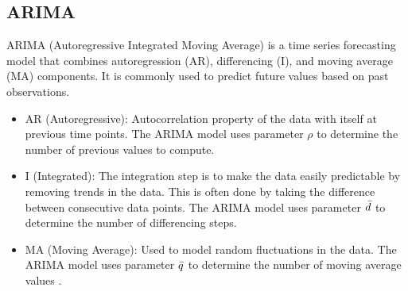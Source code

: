 \documentclass{ieeeojies}
\begin{document}
\subsection{ARIMA}
ARIMA (Autoregressive Integrated Moving Average) is a time series forecasting model that combines autoregression (AR), differencing (I), and moving average (MA) components. It is commonly used to predict future values based on past observations.
\begin{itemize}
  \item AR (Autoregressive): Autocorrelation property of the data with itself at previous time points. The ARIMA model uses parameter \(\rho\) to determine the number of previous values to compute.
  \item I (Integrated): The integration step is to make the data easily predictable by removing trends in the data. This is often done by taking the difference between consecutive data points. The ARIMA model uses parameter \(\Bar{d}\) to determine the number of differencing steps.
  \item MA (Moving Average): Used to model random fluctuations in the data. The ARIMA model uses parameter \(\Bar{q}\) to determine the number of moving average values \cite{b8, b9, b13}.
\end{itemize}
\end{document}
